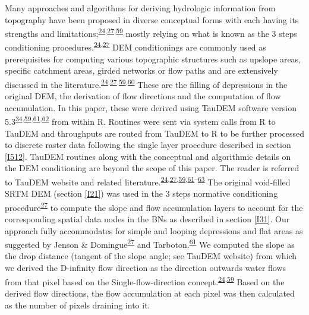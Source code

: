 \documentclass[12pt,oneside]{article}
\begin{document}
Many approaches and algorithms for deriving hydrologic information from topography have been proposed in diverse conceptual forms with each having its strengths and limitations;\textsuperscript{\protect\hyperlink{ref-Arge_et_al_2003}{24},\protect\hyperlink{ref-Jenson_and_Domingue_1988}{27},\protect\hyperlink{ref-Tarboton_1997}{59}} mostly relying on what is known as the 3 steps conditioning procedures.\textsuperscript{\protect\hyperlink{ref-Arge_et_al_2003}{24},\protect\hyperlink{ref-Jenson_and_Domingue_1988}{27}} DEM conditionings are commonly used as prerequisites for computing various topographic structures such as upslope areas, specific catchment areas, girded networks or flow paths and are extensively discussed in the literature.\textsuperscript{\protect\hyperlink{ref-Arge_et_al_2003}{24},\protect\hyperlink{ref-Jenson_and_Domingue_1988}{27},\protect\hyperlink{ref-Tarboton_1997}{59},\protect\hyperlink{ref-OCallaghan_Mark_1984}{60}} These are the filling of depressions in the original DEM, the derivation of flow directions and the computation of flow accumulation. In this paper, these were derived using TauDEM software version 5.3\textsuperscript{\protect\hyperlink{ref-Yang_et_al_2006}{34},\protect\hyperlink{ref-Tarboton_1997}{59},\protect\hyperlink{ref-Tarboton_et_al_1991}{61},\protect\hyperlink{ref-Tesfa_et_al_2011}{62}} from within R. Routines were sent via system calls from R to TauDEM and throughputs are routed from TauDEM to R to be further processed to discrete raster data following the single layer procedure described in section \ref{I512}. TauDEM routines along with the conceptual and algorithmic details on the DEM conditioning are beyond the scope of this paper. The reader is referred to TauDEM website and related literature.\textsuperscript{\protect\hyperlink{ref-Arge_et_al_2003}{24},\protect\hyperlink{ref-Jenson_and_Domingue_1988}{27},\protect\hyperlink{ref-Tarboton_1997}{59},\protect\hyperlink{ref-Tarboton_et_al_1991}{61}--\protect\hyperlink{ref-Wallis_et_al_2009}{63}}
The original void-filled SRTM DEM (section \ref{I21}) was used in the 3 steps normative conditioning procedure\textsuperscript{\protect\hyperlink{ref-Jenson_and_Domingue_1988}{27}} to compute the slope and flow accumulation layers to account for the corresponding spatial data nodes in the BNs as described in section \ref{I31}. Our approach fully accommodates for simple and looping depressions and flat areas as suggested by Jenson \& Domingue\textsuperscript{\protect\hyperlink{ref-Jenson_and_Domingue_1988}{27}} and Tarboton.\textsuperscript{\protect\hyperlink{ref-Tarboton_et_al_1991}{61}} We computed the slope as the drop distance (tangent of the slope angle; see TauDEM website) from which we derived the D-infinity flow direction as the direction outwards water flows from that pixel based on the Single-ﬂow-direction concept.\textsuperscript{\protect\hyperlink{ref-Arge_et_al_2003}{24},\protect\hyperlink{ref-Tarboton_1997}{59}} Based on the derived flow directions, the flow accumulation at each pixel was then calculated as the number of pixels draining into it.
\end{document}
